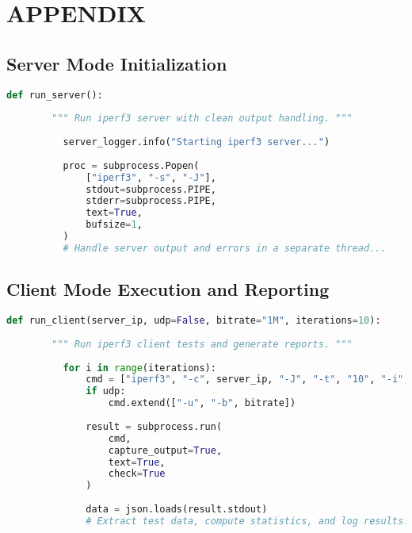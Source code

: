 
\section{APPENDIX} \label{sec:appendix}

    \subsection*{Server Mode Initialization}

        \begin{lstlisting}[language=Python, caption={Excerpt for server mode initialization.}]
      def run_server():
          
        """ Run iperf3 server with clean output handling. """
          
          server_logger.info("Starting iperf3 server...")
          
          proc = subprocess.Popen(
              ["iperf3", "-s", "-J"],
              stdout=subprocess.PIPE,
              stderr=subprocess.PIPE,
              text=True,
              bufsize=1,
          )
          # Handle server output and errors in a separate thread...
        \end{lstlisting}

    \subsection*{Client Mode Execution and Reporting}

        \begin{lstlisting}[language=Python, caption={Excerpt for client mode execution.}]
      def run_client(server_ip, udp=False, bitrate="1M", iterations=10):
          
        """ Run iperf3 client tests and generate reports. """
          
          for i in range(iterations):
              cmd = ["iperf3", "-c", server_ip, "-J", "-t", "10", "-i", "1"]
              if udp:
                  cmd.extend(["-u", "-b", bitrate])
              
              result = subprocess.run(
                  cmd,
                  capture_output=True,
                  text=True,
                  check=True
              )
              
              data = json.loads(result.stdout)
              # Extract test data, compute statistics, and log results...
        \end{lstlisting}

